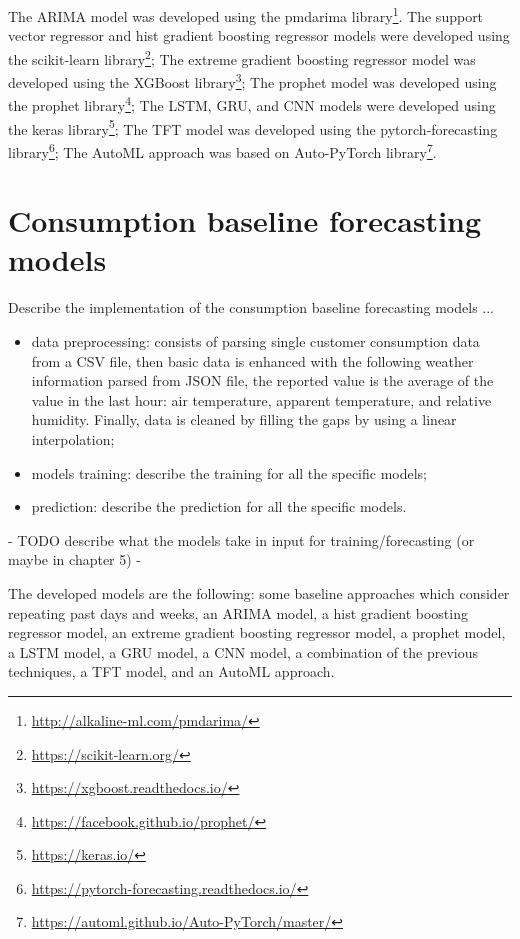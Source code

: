 The ARIMA model was developed using the pmdarima library\footnote{ \url{http://alkaline-ml.com/pmdarima/} }.
The support vector regressor and hist gradient boosting regressor models were developed using the scikit-learn library\footnote{ \url{https://scikit-learn.org/} };
The extreme gradient boosting regressor model was developed using the XGBoost library\footnote{ \url{https://xgboost.readthedocs.io/} };
The prophet model was developed using the prophet library\footnote{ \url{https://facebook.github.io/prophet/} };
The LSTM, GRU, and CNN models were developed using the keras library\footnote{ \url{https://keras.io/} };
The TFT model was developed using the pytorch-forecasting library\footnote{ \url{https://pytorch-forecasting.readthedocs.io/} };
The AutoML approach was based on Auto-PyTorch library\footnote{ \url{https://automl.github.io/Auto-PyTorch/master/} }.


\section{Consumption baseline forecasting models}
\label{sec:baselineimpl}
\vspace{0.2 cm}

Describe the implementation of the consumption baseline forecasting models ...
\begin{itemize}
  \item data preprocessing: consists of parsing single customer consumption data from a CSV file, then basic data is enhanced with the following weather information parsed from JSON file, the reported value is the average of the value in the last hour: air temperature, apparent temperature, and relative humidity. Finally, data is cleaned by filling the gaps by using a linear interpolation;
  \item models training: describe the training for all the specific models;
  \item prediction: describe the prediction for all the specific models.
\end{itemize}


 - TODO describe what the models take in input for training/forecasting (or maybe in chapter 5) -


The developed models are the following: some baseline approaches which consider repeating past days and weeks, an ARIMA model, a hist gradient boosting regressor model, an extreme gradient boosting regressor model, a prophet model, a LSTM model, a GRU model, a CNN model, a combination of the previous techniques, a TFT model, and an AutoML approach.

